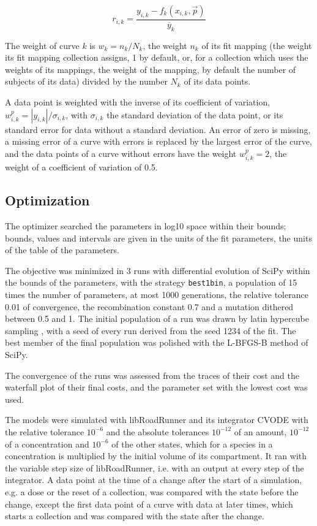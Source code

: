 \begin{equation}
r_{i,k} = \frac{y_{i,k} - f_k(x_{i,k}, \vec{p})}{\overline{y}_k}
\end{equation}

The weight of curve $k$ is $w_k = n_k / N_k$, the weight $n_k$ of its fit mapping (the weight its fit mapping collection assigns, 1 by default, or, for a collection which uses the weights of its mappings, the weight of the mapping, by default the number of subjects of its data) divided by the number $N_k$ of its data points.

A data point is weighted with the inverse of its coefficient of variation, $w^{p}_{i,k} = |y_{i,k}| / \sigma_{i,k}$, with $\sigma_{i,k}$ the standard deviation of the data point, or its standard error for data without a standard deviation. An error of zero is missing, a missing error of a curve with errors is replaced by the largest error of the curve, and the data points of a curve without errors have the weight $w^{p}_{i,k} = 2$, the weight of a coefficient of variation of 0.5.

\subsection{Optimization}

The optimizer searched the parameters in log10 space within their bounds; bounds, values and intervals are given in the units of the fit parameters, the units of the table of the parameters.

The objective was minimized in 3 runs with differential evolution \cite{Storn1997} of SciPy \cite{Virtanen2020} within the bounds of the parameters, with the strategy \texttt{best1bin}, a population of 15 times the number of parameters, at most 1000 generations, the relative tolerance 0.01 of convergence, the recombination constant 0.7 and a mutation dithered between 0.5 and 1. The initial population of a run was drawn by latin hypercube sampling \cite{McKay1979}, with a seed of every run derived from the seed 1234 of the fit. The best member of the final population was polished with the L-BFGS-B method of SciPy.

The convergence of the runs was assessed from the traces of their cost and the waterfall plot of their final costs, and the parameter set with the lowest cost was used.

The models were simulated with libRoadRunner \cite{Welsh2023} and its integrator CVODE \cite{Hindmarsh2005} with the relative tolerance $10^{-6}$ and the absolute tolerances $10^{-12}$ of an amount, $10^{-12}$ of a concentration and $10^{-6}$ of the other states, which for a species in a concentration is multiplied by the initial volume of its compartment. It ran with the variable step size of libRoadRunner, i.e. with an output at every step of the integrator. A data point at the time of a change after the start of a simulation, e.g. a dose or the reset of a collection, was compared with the state before the change, except the first data point of a curve with data at later times, which starts a collection and was compared with the state after the change.


